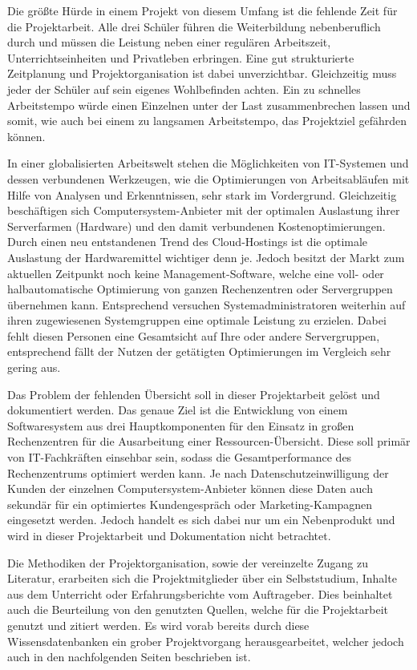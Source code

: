 Die größte Hürde in einem Projekt von diesem Umfang ist die fehlende Zeit für
die Projektarbeit. Alle drei Schüler führen die Weiterbildung nebenberuflich
durch und müssen die Leistung neben einer regulären Arbeitszeit,
Unterrichtseinheiten und Privatleben erbringen. Eine gut strukturierte
Zeitplanung und Projektorganisation ist dabei unverzichtbar. Gleichzeitig muss
jeder der Schüler auf sein eigenes Wohlbefinden achten. Ein zu schnelles
Arbeitstempo würde einen Einzelnen unter der Last zusammenbrechen lassen und
somit, wie auch bei einem zu langsamen Arbeitstempo, das Projektziel gefährden
können.

In einer globalisierten Arbeitswelt stehen die Möglichkeiten von
IT\hyp{}Systemen und dessen verbundenen Werkzeugen, wie die Optimierungen von
Arbeitsabläufen mit Hilfe von Analysen und Erkenntnissen, sehr stark im
Vordergrund. Gleichzeitig beschäftigen sich Computersystem\hyp{}Anbieter mit
der optimalen Auslastung ihrer Serverfarmen (Hardware) und den damit
verbundenen Kostenoptimierungen. Durch einen neu entstandenen Trend des
\gls{Cloud}\hyp{}Hostings ist die optimale Auslastung der Hardwaremittel
wichtiger denn je. Jedoch besitzt der Markt zum aktuellen Zeitpunkt noch keine
Management\hyp{}Software, welche eine voll- oder halbautomatische Optimierung
von ganzen Rechenzentren oder Servergruppen übernehmen kann. Entsprechend
versuchen Systemadministratoren weiterhin auf ihren zugewiesenen Systemgruppen
eine optimale Leistung zu erzielen. Dabei fehlt diesen Personen eine
Gesamtsicht auf Ihre oder andere Servergruppen, entsprechend fällt der Nutzen
der getätigten Optimierungen im Vergleich sehr gering aus.

Das Problem der fehlenden Übersicht soll in dieser Projektarbeit gelöst und
dokumentiert werden. Das genaue Ziel ist die Entwicklung von einem
Softwaresystem aus drei Hauptkomponenten für den Einsatz in großen
Rechenzentren für die Ausarbeitung einer Ressourcen\hyp{}Übersicht. Diese soll
primär von IT\hyp{}Fachkräften einsehbar sein, sodass die Gesamtperformance des
Rechenzentrums optimiert werden kann. Je nach Datenschutzeinwilligung der
Kunden der einzelnen Computersystem\hyp{}Anbieter können diese Daten auch
sekundär für ein optimiertes Kundengespräch oder Marketing\hyp{}Kampagnen
eingesetzt werden. Jedoch handelt es sich dabei nur um ein Nebenprodukt und
wird in dieser Projektarbeit und Dokumentation nicht betrachtet.

Die Methodiken der Projektorganisation, sowie der vereinzelte Zugang zu
Literatur, erarbeiten sich die Projektmitglieder über ein Selbststudium,
Inhalte aus dem Unterricht oder Erfahrungsberichte vom Auftrageber. Dies
beinhaltet auch die Beurteilung von den genutzten Quellen, welche für die
Projektarbeit genutzt und zitiert werden. Es wird vorab bereits durch diese
Wissensdatenbanken ein grober Projektvorgang herausgearbeitet, welcher jedoch
auch in den nachfolgenden Seiten beschrieben ist.
\all%

